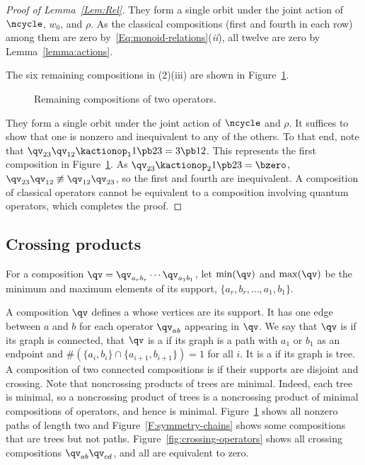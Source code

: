 \begin{proof}[Proof of Lemma~\ref{Lem:Rel}]
 They form a single orbit under the joint action of $\ncycle$, $w_0$, and $\rho$.
 As the classical compositions (first and fourth in each row) among them are zero by~\eqref{Eq:monoid-relations}({\it ii}), all twelve are
 zero by Lemma~\ref{lemma:actions}.

 The six remaining compositions in (2)(iii) are shown in Figure~\ref{fig:nonzero-touching-operators}.

 \begin{figure}[htb]
 \centering
     \quad
     \quad
     \quad
     \quad
     \quad
  \caption{Remaining compositions of two operators.}
  \label{fig:nonzero-touching-operators}
 \end{figure}

 They form a single orbit under the joint action of $\ncycle$ and $\rho$.
 It suffices to show that one is nonzero and inequivalent to any of the others.
 To that end, note that  $ \qv_{23} \qv_{12}\kactionop_1 1\pb23 = 3\pb12$.
 This represents the first composition in Figure~\ref{fig:nonzero-touching-operators}.
 As $\qv_{23}\kactionop_2 1\pb23 = \bzero$, $\qv_{23} \qv_{12}\not\equiv \qv_{12}\qv_{23}$, so the first and fourth are inequivalent.
 A composition of classical operators cannot be equivalent to a composition involving quantum operators, which completes the proof.
\end{proof}

\subsection{Crossing products}
\label{crossing-products}
For a composition $\qv=\qv_{a_rb_r}\cdots \qv_{a_1b_1}$, let  $\min(\qv)$ and $\max(\qv)$ be the minimum and maximum elements
of its support, $\{a_r,b_r,\dots, a_1,b_1\}$.


A composition $\qv$ defines a  whose vertices are its support.
It has one edge between $a$ and $b$ for each operator $\qv_{ab}$ appearing in $\qv$.
We say that $\qv$ is  if its graph is connected, that $\qv$ is a  if its graph is a path with $a_1$ or $b_1$ as
an endpoint and $\#(\{a_i,b_i\}\cap\{a_{i+1},b_{i+1}\})=1$ for all $i$.
It is a  if its graph is tree.
A composition of two connected compositions is  if their supports are disjoint and crossing.
Note that noncrossing products of trees are minimal.  Indeed, each tree is minimal, so a noncrossing product of trees is a noncrossing product of minimal compositions of operators, and hence is minimal.
Figure~\ref{fig:nonzero-touching-operators} shows all nonzero paths of length two and Figure~\ref{F:symmetry-chains} shows some
compositions that are trees but not paths.  
Figure~\ref{fig:crossing-operators} shows all crossing compositions $\qv_{ab} \qv_{cd}$,
and all are equivalent to zero.

